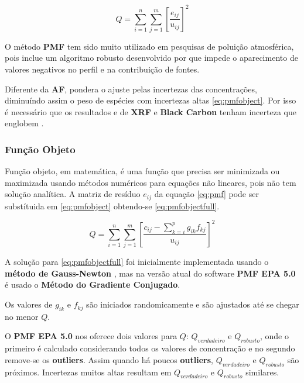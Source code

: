 \begin{equation}
  Q = \sum_{i=1}^n \sum_{j=1}^m  \left[ \frac{e_{ij}} {u_{ij}} \right] ^2
  \label{eq:pmfobject}
\end{equation}

O método \textbf{PMF} tem sido muito utilizado em pesquisas de poluição 
atmosférica, pois inclue um algoritmo robusto desenvolvido por \citep{paatero1994}
que impede o aparecimento de valores negativos no perfil e na contribuição de fontes.

Diferente da \textbf{AF}, pondera o ajuste pelas incertezas das concentrações, 
diminuíndo assim o peso de espécies com incertezas altas \ref{eq:pmfobject}.
Por isso é necessário que os resultados e de \textbf{XRF} e \textbf{Black Carbon}
tenham incerteza que englobem .

\subsubsection{Função Objeto}

Função objeto, em matemática, é uma função que precisa ser minimizada 
ou maximizada usando métodos numéricos para equações não lineares, pois não 
tem solução analítica. A matriz de resíduo ${e_{ij}}$ da equação \ref{eq:pmf}
pode ser substítuida em \ref{eq:pmfobject} obtendo-se \ref{eq:pmfobjectfull}.

\begin{equation}
  Q = \sum_{i=1}^n \sum_{j=1}^m  \left[ \frac{c_{ij} - \sum_{k=i}^p g_{ik}f_{kj}} {u_{ij}} \right] ^2
  \label{eq:pmfobjectfull}
\end{equation}

A solução para \ref{eq:pmfobjectfull} foi inicialmente implementada usando 
o \textbf{método de Gauss-Newton} \citep{paatero1994}, mas na 
versão atual do software \textbf{PMF EPA 5.0} \citep{norris2014} é usado o 
\textbf{Método do Gradiente Conjugado}.

Os valores de $g_{ik}$ e $f_{kj}$ são iniciados randomicamente e
são ajustados até se chegar no menor $Q$.
 
O \textbf{PMF EPA 5.0} nos oferece dois valores para $Q$: $Q_{verdadeiro}$ e 
$Q_{robusto}$, onde o primeiro é calculado considerando todos os valores 
de concentração e no segundo remove-se os \textbf{outliers}.
Assim quando há poucos \textbf{outliers}, $Q_{verdadeiro}$ e $Q_{robusto}$ 
são próximos. Incertezas muitos altas resultam em $Q_{verdadeiro}$ e 
$Q_{robusto}$ similares.


